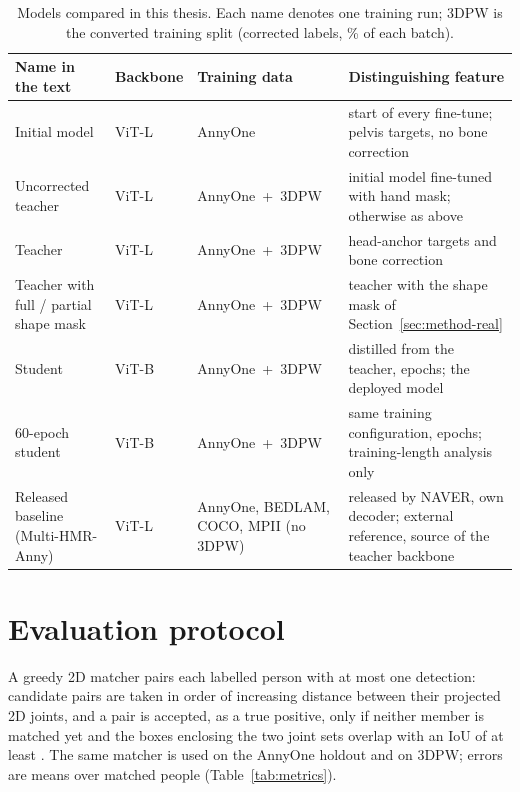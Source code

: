 \begin{table}[!htb]
\centering\footnotesize
\setlength{\tabcolsep}{4pt}
\begin{tabular}{@{}>{\raggedright}p{2.7cm}>{\raggedright}p{1.4cm}>{\raggedright}p{2.85cm}>{\raggedright\arraybackslash}p{4.85cm}@{}}
\toprule
Name in the text & Backbone & Training data & Distinguishing feature \\
\midrule
Initial model & ViT-L & AnnyOne & start of every fine-tune; pelvis targets, no bone correction \\
Uncorrected teacher & ViT-L & \mbox{AnnyOne + 3DPW} & initial model fine-tuned with hand mask; otherwise as above \\
Teacher & ViT-L & \mbox{AnnyOne + 3DPW} & head-anchor targets and bone correction \\
Teacher with full / partial shape mask & ViT-L & \mbox{AnnyOne + 3DPW} & teacher with the shape mask of Section~\ref{sec:method-real} \\
Student & ViT-B & \mbox{AnnyOne + 3DPW} & distilled from the teacher, \MethodStudentEpochs{} epochs; the deployed model \\
60-epoch student & ViT-B & \mbox{AnnyOne + 3DPW} & same training configuration, \StudentSixtyEpochs{} epochs; training-length analysis only \\
Released baseline (Multi-HMR-Anny) & ViT-L & AnnyOne, BEDLAM, COCO, MPII (no 3DPW) & released by NAVER, own decoder; external reference, source of the teacher backbone \\
\bottomrule
\end{tabular}
\caption[Models compared]{Models compared in this thesis. Each name denotes one training run; 3DPW is the converted
training split (corrected labels, \MethodMixRatio\% of each batch).}
\label{tab:model-names}
\end{table}

\section{Evaluation protocol}
\label{sec:method-eval}

A greedy 2D matcher pairs each labelled person with at most one detection: candidate pairs are taken in order of
increasing distance between their projected 2D joints, and a pair is accepted, as a true positive, only if neither
member is matched yet and the boxes enclosing the two joint sets overlap with an IoU of at least \MethodMatchIoU. The
same matcher is used on the AnnyOne holdout and on 3DPW; errors are means over matched people
(Table~\ref{tab:metrics}).

